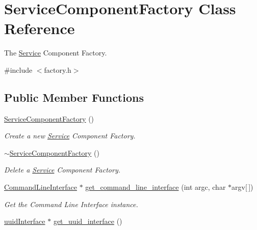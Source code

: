 \hypertarget{classServiceComponentFactory}{\section{Service\-Component\-Factory Class Reference}
\label{classServiceComponentFactory}
}


The \hyperlink{classService}{Service} Component Factory.  




{\ttfamily \#include $<$factory.\-h$>$}

\subsection*{Public Member Functions}
\begin{DoxyCompactItemize}
\item 
\hypertarget{classServiceComponentFactory_a0d91931c88bb8df41ee4f58b54c3cc8f}{\hyperlink{classServiceComponentFactory_a0d91931c88bb8df41ee4f58b54c3cc8f}{Service\-Component\-Factory} ()}\label{classServiceComponentFactory_a0d91931c88bb8df41ee4f58b54c3cc8f}

\begin{DoxyCompactList}\small\item\em Create a new \hyperlink{classService}{Service} Component Factory. \end{DoxyCompactList}\item 
\hypertarget{classServiceComponentFactory_a377472acb3040b7e06749ff48239ebd4}{\hyperlink{classServiceComponentFactory_a377472acb3040b7e06749ff48239ebd4}{$\sim$\-Service\-Component\-Factory} ()}\label{classServiceComponentFactory_a377472acb3040b7e06749ff48239ebd4}

\begin{DoxyCompactList}\small\item\em Delete a \hyperlink{classService}{Service} Component Factory. \end{DoxyCompactList}\item 
\hypertarget{classServiceComponentFactory_a7783b94ad65b0be4de8e4658f5b0ab4f}{\hyperlink{classCommandLineInterface}{Command\-Line\-Interface} $\ast$ \hyperlink{classServiceComponentFactory_a7783b94ad65b0be4de8e4658f5b0ab4f}{get\-\_\-command\-\_\-line\-\_\-interface} (int argc, char $\ast$argv\mbox{[}$\,$\mbox{]})}\label{classServiceComponentFactory_a7783b94ad65b0be4de8e4658f5b0ab4f}

\begin{DoxyCompactList}\small\item\em Get the Command Line Interface instance. \end{DoxyCompactList}\item 
\hypertarget{classServiceComponentFactory_a3c7d8ab1a2a2a88eac293d5a10610829}{\hyperlink{classuuidInterface}{uuid\-Interface} $\ast$ \hyperlink{classServiceComponentFactory_a3c7d8ab1a2a2a88eac293d5a10610829}{get\-\_\-uuid\-\_\-interface} ()}\label{classServiceComponentFactory_a3c7d8ab1a2a2a88eac293d5a10610829}


\end{DoxyCompactItemize}
